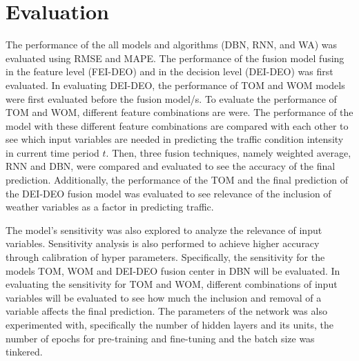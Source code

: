 \section{Evaluation}
The performance of the all models and algorithms (DBN, RNN, and WA) was evaluated using RMSE and MAPE. The performance of the fusion model fusing in the feature level (FEI-DEO) and in the decision level (DEI-DEO) was first evaluated. In evaluating DEI-DEO, the performance of TOM and WOM models were first evaluated before the fusion model/s. To evaluate the performance of TOM and WOM, different feature combinations are were. The performance of the model with these different feature combinations are compared with each other to see which input variables are needed in predicting the traffic condition intensity in current time period $t$. Then, three fusion techniques, namely weighted average, RNN and DBN, were compared and evaluated to see the accuracy of the final prediction. Additionally, the performance of the TOM and the final prediction of the DEI-DEO fusion model was evaluated to see relevance of the inclusion of weather variables as a factor in predicting traffic. 

The model’s sensitivity was also explored to analyze the relevance of input variables. Sensitivity analysis is also performed to achieve higher accuracy through calibration of hyper parameters. Specifically, the sensitivity for the models TOM, WOM and DEI-DEO fusion center in DBN will be evaluated. In evaluating the sensitivity for TOM and WOM, different combinations of input variables will be evaluated to see how much the inclusion and removal of a variable affects the final prediction. The parameters of the network was also experimented with, specifically the number of hidden layers and its units, the number of epochs for pre-training and fine-tuning and the batch size was tinkered.